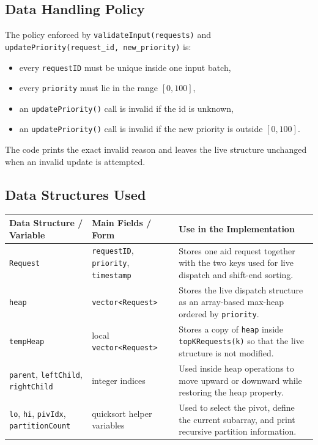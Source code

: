 \documentclass[10pt,a4paper]{article}
\begin{document}
\subsection{Data Handling Policy}
The policy enforced by \texttt{validateInput(requests)} and \texttt{updatePriority(request\_id, new\_priority)} is:
\begin{itemize}
    \item every \texttt{requestID} must be unique inside one input batch,
    \item every \texttt{priority} must lie in the range \([0, 100]\),
    \item an \texttt{updatePriority()} call is invalid if the id is unknown,
    \item an \texttt{updatePriority()} call is invalid if the new priority is outside \([0, 100]\).
\end{itemize}
The code prints the exact invalid reason and leaves the live structure unchanged when an invalid update is attempted.

\subsection{Data Structures Used}
\begin{table}[H]
\centering
\scriptsize
\begin{tabularx}{\textwidth}{|p{3.0cm}|p{3.2cm}|X|}
\hline
\textbf{Data Structure / Variable} & \textbf{Main Fields / Form} & \textbf{Use in the Implementation} \\
\hline
\texttt{Request} & \texttt{requestID}, \texttt{priority}, \texttt{timestamp} & Stores one aid request together with the two keys used for live dispatch and shift-end sorting. \\
\hline
\texttt{heap} & \texttt{vector<Request>} & Stores the live dispatch structure as an array-based max-heap ordered by \texttt{priority}. \\
\hline
\texttt{tempHeap} & local \texttt{vector<Request>} & Stores a copy of \texttt{heap} inside \texttt{topKRequests(k)} so that the live structure is not modified. \\
\hline
\texttt{parent}, \texttt{leftChild}, \texttt{rightChild} & integer indices & Used inside heap operations to move upward or downward while restoring the heap property. \\
\hline
\texttt{lo}, \texttt{hi}, \texttt{pivIdx}, \texttt{partitionCount} & quicksort helper variables & Used to select the pivot, define the current subarray, and print recursive partition information. \\
\hline
\end{tabularx}
\end{table}
\end{document}
